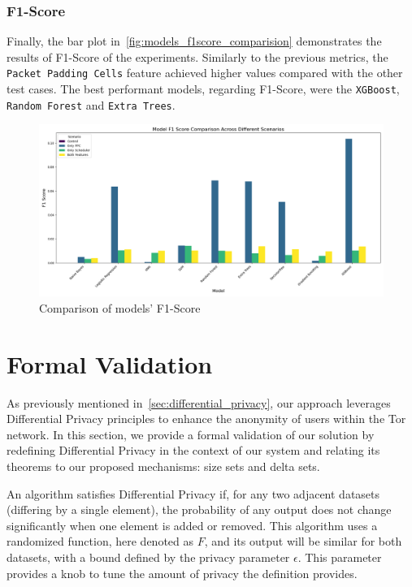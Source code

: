 \subsubsection{F1-Score}

Finally, the bar plot in~\autoref{fig:models_f1score_comparision} demonstrates the results of F1-Score of the experiments. Similarly to the previous metrics, the \texttt{Packet Padding Cells} feature achieved higher values compared with the other test cases. The best performant models, regarding F1-Score, were the \texttt{XGBoost}, \texttt{Random Forest} and \texttt{Extra Trees}.

\begin{figure}[!h]
  \centering
  \includegraphics[width=\textwidth]{Chapters/Figures/Plots/obs_F1 Score_comparison.png}
  \caption{Comparison of models' F1-Score}\label{fig:models_f1score_comparision}
\end{figure}


\section{Formal Validation}\label{sec:formal_validation}

As previously mentioned in~\autoref{sec:differential_privacy}, our approach leverages Differential Privacy principles to enhance the anonymity of users within the Tor network. In this section, we provide a formal validation of our solution by redefining Differential Privacy in the context of our system and relating its theorems to our proposed mechanisms: size sets and delta sets.

An algorithm satisfies Differential Privacy if, for any two adjacent datasets (differing by a single element), the probability of any output does not change significantly when one element is added or removed. This algorithm uses a randomized function, here denoted as $F$, and its output will be similar for both datasets, with a bound defined by the privacy parameter $\epsilon$. This parameter provides a knob to tune the amount of privacy the definition provides.

